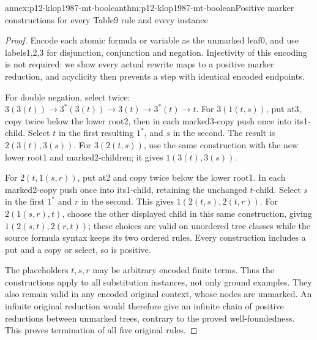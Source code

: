 \begin{annexitem}{annex:p12-klop1987-mt-boolean}{thm:p12-klop1987-mt-boolean}{Positive marker constructions for every Table9 rule and every instance}
\begin{proof}
Encode each atomic formula or variable as the unmarked leaf0, and
use labels1,2,3 for disjunction, conjunction and negation. Injectivity
of this encoding is not required: we show every actual rewrite maps
to a positive marker reduction, and acyclicity then prevents a step
with identical encoded endpoints.

For double negation, select twice:
\(3(3(t))\to3^*(3(t))\to3(t)\to3^*(t)\to t\).
For \(3(1(t,s))\), put at3, copy twice below the lower root2,
then in each marked3-copy push once into its1-child. Select \(t\)
in the first resulting \(1^*\), and \(s\) in the second.
The result is \(2(3(t),3(s))\).
For \(3(2(t,s))\), use the same construction with the new lower
root1 and marked2-children; it gives \(1(3(t),3(s))\).

For \(2(t,1(s,r))\), put at2 and copy twice below the lower
root1. In each marked2-copy push once into its1-child, retaining
the unchanged \(t\)-child. Select \(s\) in the first \(1^*\)
and \(r\) in the second. This gives
\(1(2(t,s),2(t,r))\). For \(2(1(s,r),t)\), choose the other
displayed child in this same construction, giving
\(1(2(s,t),2(r,t))\); these choices are valid on unordered tree
classes while the source formula syntax keeps its two ordered rules.
Every construction includes a put and a copy or select, so is positive.

The placeholders \(t,s,r\) may be arbitrary encoded finite terms.
Thus the constructions apply to all substitution instances, not only
ground examples. They also remain valid in any encoded original
context, whose nodes are unmarked. An infinite original reduction
would therefore give an infinite chain of positive reductions between
unmarked trees, contrary to the proved well-foundedness. This proves
termination of all five original rules.
\end{proof}
\end{annexitem}

